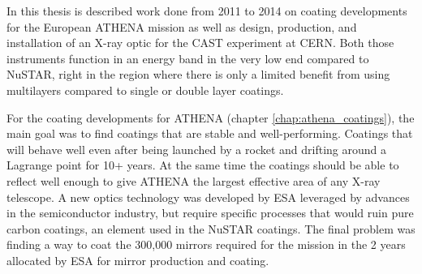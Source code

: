 In this thesis is described work done from 2011 to 2014 on coating developments for the European ATHENA mission as well as design, production, and installation of an X-ray optic for the CAST experiment at CERN. Both those instruments function in an energy band in the very low end compared to NuSTAR, right in the region where there is only a limited benefit from using multilayers compared to single or double layer coatings.

For the coating developments for ATHENA (chapter \ref{chap:athena_coatings}), the main goal was to find coatings that are stable and well-performing. Coatings that will behave well even after being launched by a rocket and drifting around a Lagrange point for 10+ years. At the same time the coatings should be able to reflect well enough to give ATHENA the largest effective area of any X-ray telescope. A new optics technology was developed by ESA leveraged by advances in the semiconductor industry, but require specific processes that would ruin pure carbon coatings, an element used in the NuSTAR coatings. The final problem was finding a way to coat the 300,000 mirrors required for the mission in the 2 years allocated by ESA for mirror production and coating.

